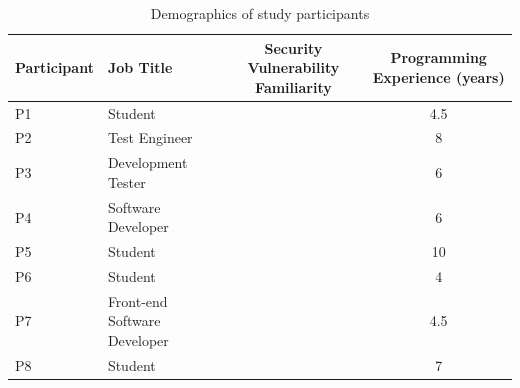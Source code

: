 \documentclass[conference]{IEEEtran}
\begin{document}
\begin{table} 
\centering
\caption{Demographics of study participants}
\begin{tabular}{|l|l|c|S|}
\hline
    Participant		& Job Title 						& Security Vulnerability Familiarity 						& Programming Experience (years) \\
    \hline
    P1			    & Student     						&  	&  4.5    \\
    \hline
    P2			    & Test Engineer    					& 		&  8 		\\
    \hline
    P3 				& Development Tester       			& 			&  6 	    	\\
    \hline
    P4				& Software Developer     			& 			&  6     	\\
    \hline
    P5				& Student      						& 			&  10 	\\
    \hline
    P6				& Student		    				& 				& 4		\\
    \hline
    P7				& Front-end Software Developer    	& 		& 4.5         \\
    \hline
    P8				& Student	    					& 		& 7   \\

\end{tabular}
\end{table}
\end{document}
